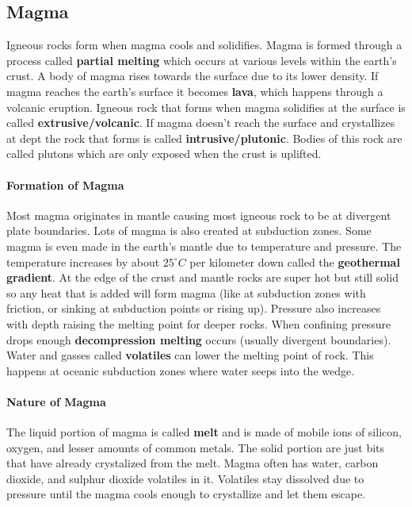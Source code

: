 \documentclass{article}
\begin{document}
\subsection*{Magma} %
\label{sub:magma}
Igneous rocks form when magma cools and solidifies. Magma is formed through a process called \textbf{partial melting} which occurs at various levels within the earth's crust. A body of magma rises towards the surface due to its lower density. If magma reaches the earth's surface it becomes \textbf{lava}, which happens through a volcanic eruption. Igneous rock that forms when magma solidifies at the surface is called \textbf{extrusive/volcanic}. If magma doesn't reach the surface and crystallizes at dept the rock that forms is called \textbf{intrusive/plutonic}. Bodies of this rock are called plutons which are only exposed when the crust is uplifted.

\paragraph{Formation of Magma} %
\label{par:formation_of_magma}
Most magma originates in mantle causing most igneous rock to be at divergent plate boundaries. Lots of magma is also created at subduction zones. Some magma is even made in the earth's mantle due to temperature and pressure. The temperature increases by about $25^{\circ} C$ per kilometer down called the \textbf{geothermal gradient}. At the edge of the crust and mantle rocks are super hot but still solid so any heat that is added will form magma (like at subduction zones with friction, or sinking at subduction points or rising up). Pressure also increases with depth raising the melting point for deeper rocks. When confining pressure drops enough \textbf{decompression melting} occurs (usually divergent boundaries). Water and gasses called \textbf{volatiles} can lower the melting point of rock. This happens at oceanic subduction zones where water seeps into the wedge.

\paragraph{Nature of Magma} %
\label{par:nature_of_magma}
The liquid portion of magma is called \textbf{melt} and is made of mobile ions of silicon, oxygen, and lesser amounts of common metals. The solid portion are just bits that have already crystalized from the melt. Magma often has water, carbon dioxide, and sulphur dioxide volatiles in it. Volatiles stay dissolved due to pressure until the magma cools enough to crystallize and let them escape.
\end{document}
